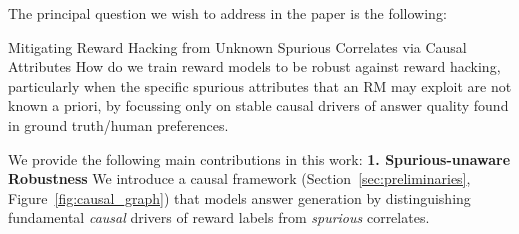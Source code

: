 
The principal question we wish to address in the paper is the following:
\begin{remarkbox}{Mitigating Reward Hacking from Unknown Spurious Correlates via Causal Attributes}
How do we train reward models to be robust against reward hacking, particularly when the specific spurious attributes that an RM may exploit are not known a priori, by focussing only on stable causal drivers of answer quality found in ground truth/human preferences.
\end{remarkbox}


We provide the following main contributions in this work:
\textbf{1. Spurious-unaware Robustness} We introduce a causal framework (Section~\ref{sec:preliminaries}, Figure~\ref{fig:causal_graph}) that models answer generation by distinguishing fundamental \emph{causal} drivers of reward labels from \emph{spurious} correlates.



